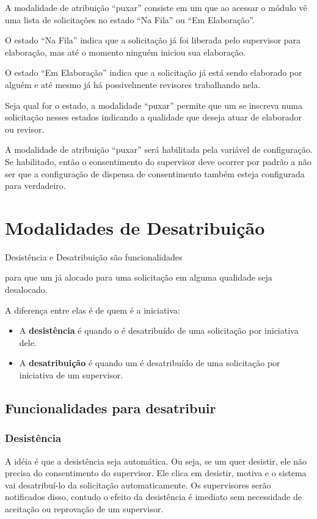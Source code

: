 A modalidade de atribuição ``puxar'' consiste em um \CL que ao acessar o módulo vê uma lista de solicitações no estado ``Na Fila'' ou ``Em Elaboração''. 

O estado ``Na Fila'' indica que a solicitação já foi liberada pelo supervisor para elaboração, mas até o momento ninguém iniciou sua elaboração. 

O estado ``Em Elaboração'' indica que a solicitação já está sendo elaborado por alguém e até mesmo já há possivelmente revisores trabalhando nela. 

Seja qual for o estado, a modalidade ``puxar'' permite que um \CL se inscreva numa solicitação nesses estados indicando a qualidade que deseja atuar de elaborador ou revisor.  

A modalidade de atribuição ``puxar'' será habilitada pela variável de configuração. Se habilitado, então o consentimento do supervisor deve ocorrer por padrão a não ser que a configuração de dispensa de consentimento também esteja configurada para verdadeiro.

\section{Modalidades de Desatribuição}

\hypertarget{data230823mudanca4}{Desistência e Desatribuição são funcionalidades} para que um \CL já alocado para uma solicitação em alguma qualidade seja desalocado. 

A diferença entre elas é de quem é a iniciativa:

\begin{itemize}
	\item A \textbf{desistência} é quando o \CL é desatribuído de uma solicitação por iniciativa dele.
	
	\item A \textbf{desatribuição} é quando um \CL é desatribuído de uma solicitação por iniciativa de um supervisor.
\end{itemize}

\subsection{Funcionalidades para desatribuir}

\subsubsection{Desistência}

A idéia é que a desistência seja automática. Ou seja, se um \CL quer desistir, ele não precisa do consentimento do supervisor. Ele clica em desistir, motiva e o sistema vai desatribuí-lo da solicitação automaticamente. Os supervisores serão notificados disso, contudo o efeito da desistência é imediato sem necessidade de aceitação ou reprovação de um supervisor.

